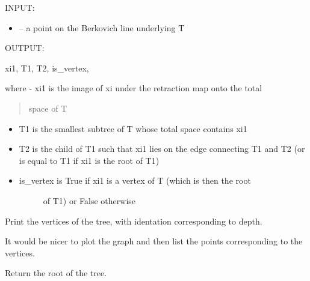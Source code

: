 \documentclass[letterpaper,10pt,english]{sphinxmanual}
\begin{document}
\begin{fulllineitems}
\begin{fulllineitems}
INPUT:
\begin{itemize}
\item {} 
 -- a point on the Berkovich line underlying T

\end{itemize}

OUTPUT:

xi1, T1, T2, is\_vertex,

where
- xi1 is the image of xi under the retraction map onto the total
\begin{quote}

space of T
\end{quote}
\begin{itemize}
\item {} 
T1 is the smallest subtree of T whose total space contains xi1

\item {} 
T2 is the child of T1 such that xi1 lies on the edge connecting
T1 and T2 (or is equal to T1 if xi1 is the root of T1)

\item {} \begin{description}
\item[{is\_vertex is True if xi1 is a vertex of T (which is then the root}] \leavevmode
of T1) or False otherwise

\end{description}

\end{itemize}

\end{fulllineitems}


\begin{fulllineitems}
\label{berkovich_trees:mclf.berkovich.berkovich_trees.BerkovichTree.print_tree}
Print the vertices of the tree, with identation corresponding to depth.

It would be nicer to plot the graph and then list the points corresponding
to the vertices.

\end{fulllineitems}


\begin{fulllineitems}
\label{berkovich_trees:mclf.berkovich.berkovich_trees.BerkovichTree.root}
Return the root of the tree.


\end{fulllineitems}
\end{fulllineitems}
\end{document}
